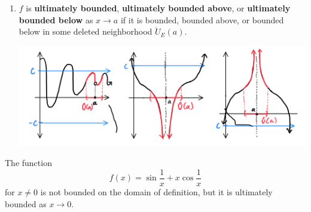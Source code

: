 \documentclass{article}
\begin{document}
\begin{definition}[Functions]
\begin{enumerate}
\begin{center}
        \end{center}
        \item $f$ is \textbf{ultimately bounded}, \textbf{ultimately bounded above}, or \textbf{ultimately bounded below} as $x \rightarrow a$ if it is bounded, bounded above, or bounded below in some deleted neighborhood $\mathring{U}_E (a)$. 
        \begin{center}
            \includegraphics[scale=0.25]{img/Ultimately_Bounded_Three.PNG}
        \end{center}
      \end{enumerate}
    \end{definition}

    \begin{example}
      The function 
      \[f(x) = \sin{\frac{1}{x}} + x \cos{\frac{1}{x}}\]
      for $x \neq 0$ is not bounded on the domain of definition, but it is ultimately bounded as $x \rightarrow 0$. 

    \end{example}
\end{document}
